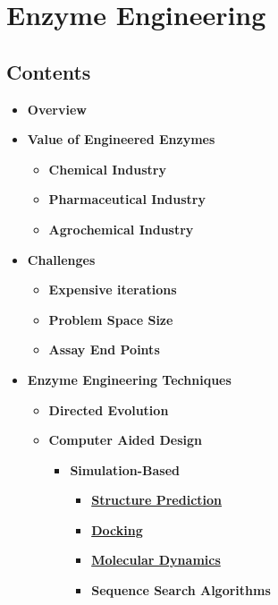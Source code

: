 \hypertarget{enzyme-engineering}{%
\section{Enzyme Engineering}\label{enzyme-engineering}}

\hypertarget{contents-6}{%
\subsection{Contents}\label{contents-6}}

\begin{itemize}
\tightlist
\item
  \textbf{Overview}
\item
  \textbf{Value of Engineered Enzymes}

  \begin{itemize}
  \tightlist
  \item
    \textbf{Chemical Industry}
  \item
    \textbf{Pharmaceutical Industry}
  \item
    \textbf{Agrochemical Industry}
  \end{itemize}
\item
  \textbf{Challenges}

  \begin{itemize}
  \tightlist
  \item
    \textbf{Expensive iterations}
  \item
    \textbf{Problem Space Size}
  \item
    \textbf{Assay End Points}
  \end{itemize}
\item
  \textbf{Enzyme Engineering Techniques}

  \begin{itemize}
  \tightlist
  \item
    \textbf{Directed Evolution}
  \item
    \textbf{Computer Aided Design}

    \begin{itemize}
    \tightlist
    \item
      \textbf{Simulation-Based}

      \begin{itemize}
      \tightlist
      \item
        \textbf{\href{protein-structure-mred.md}{Structure Prediction}}
      \item
        \textbf{\href{docking.md}{Docking}}
      \item
        \textbf{\href{molecular-dynamics.md}{Molecular Dynamics}}
      \item
        \textbf{Sequence Search Algorithms}


\end{itemize}
\end{itemize}
\end{itemize}
\end{itemize}
